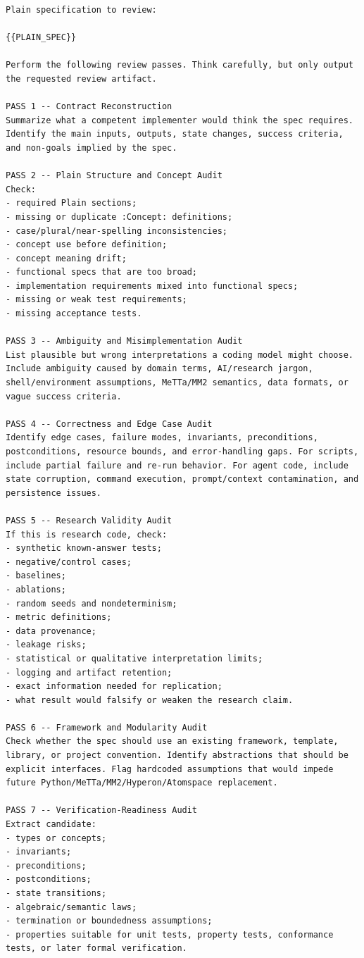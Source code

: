 \documentclass[11pt]{article}
\begin{document}
\begin{lstlisting}
Plain specification to review:

{{PLAIN_SPEC}}

Perform the following review passes. Think carefully, but only output the requested review artifact.

PASS 1 -- Contract Reconstruction
Summarize what a competent implementer would think the spec requires. Identify the main inputs, outputs, state changes, success criteria, and non-goals implied by the spec.

PASS 2 -- Plain Structure and Concept Audit
Check:
- required Plain sections;
- missing or duplicate :Concept: definitions;
- case/plural/near-spelling inconsistencies;
- concept use before definition;
- concept meaning drift;
- functional specs that are too broad;
- implementation requirements mixed into functional specs;
- missing or weak test requirements;
- missing acceptance tests.

PASS 3 -- Ambiguity and Misimplementation Audit
List plausible but wrong interpretations a coding model might choose. Include ambiguity caused by domain terms, AI/research jargon, shell/environment assumptions, MeTTa/MM2 semantics, data formats, or vague success criteria.

PASS 4 -- Correctness and Edge Case Audit
Identify edge cases, failure modes, invariants, preconditions, postconditions, resource bounds, and error-handling gaps. For scripts, include partial failure and re-run behavior. For agent code, include state corruption, command execution, prompt/context contamination, and persistence issues.

PASS 5 -- Research Validity Audit
If this is research code, check:
- synthetic known-answer tests;
- negative/control cases;
- baselines;
- ablations;
- random seeds and nondeterminism;
- metric definitions;
- data provenance;
- leakage risks;
- statistical or qualitative interpretation limits;
- logging and artifact retention;
- exact information needed for replication;
- what result would falsify or weaken the research claim.

PASS 6 -- Framework and Modularity Audit
Check whether the spec should use an existing framework, template, library, or project convention. Identify abstractions that should be explicit interfaces. Flag hardcoded assumptions that would impede future Python/MeTTa/MM2/Hyperon/Atomspace replacement.

PASS 7 -- Verification-Readiness Audit
Extract candidate:
- types or concepts;
- invariants;
- preconditions;
- postconditions;
- state transitions;
- algebraic/semantic laws;
- termination or boundedness assumptions;
- properties suitable for unit tests, property tests, conformance tests, or later formal verification.


\end{lstlisting}
\end{document}
